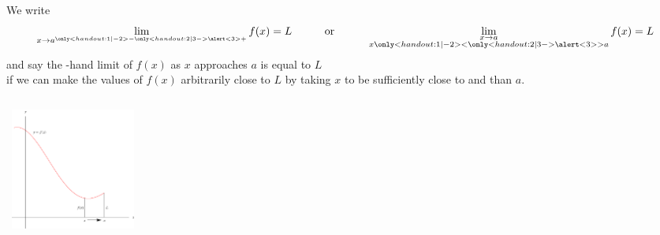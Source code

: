 \begin{frame}
\begin{definition}
We write
\[
\lim_{x\rightarrow a^{\only<handout:1| -2>{-}\only<handout:2| 3->{\alert<3>{+}}}}f(x) = L \quad \quad \quad \mathrm{or} \quad \quad \quad  \lim\limits_{\substack{x\rightarrow a \\ x\only<handout:1| -2>{<}\only<handout:2| 3->{\alert<3>{>}}a
}}f(x)=L
\]
and say the -hand limit of $f(x)$ as $x$ approaches $a$ is equal to $L$ \\  if we can make the values of $f(x)$ arbitrarily close to $L$ by taking $x$ to be sufficiently close to and  than $a$.
\end{definition}
\begin{columns}[c]
\ \includegraphics[height=4cm]{limits/pictures/02-02-leftlim.pdf}%
%
\end{columns}
%
\end{frame}
